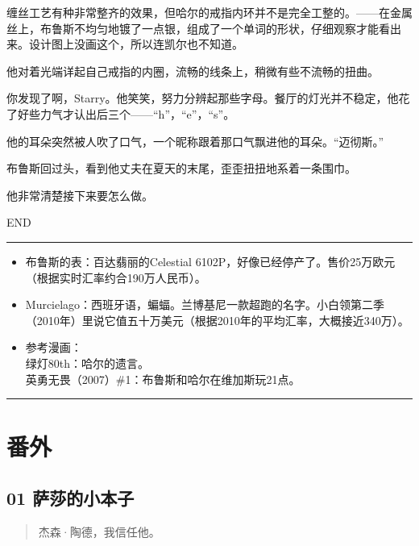 \documentclass[../main]{subfiles}
\begin{document}
缠丝工艺有种非常整齐的效果，但哈尔的戒指内环并不是完全工整的。——在金属丝上，布鲁斯不均匀地镀了一点银，组成了一个单词的形状，仔细观察才能看出来。设计图上没画这个，所以连凯尔也不知道。

他对着光端详起自己戒指的内圈，流畅的线条上，稍微有些不流畅的扭曲。

你发现了啊，Starry。他笑笑，努力分辨起那些字母。餐厅的灯光并不稳定，他花了好些力气才认出后三个——“h”，“e”，“s”。

他的耳朵突然被人吹了口气，一个昵称跟着那口气飘进他的耳朵。“迈彻斯。”

布鲁斯回过头，看到他丈夫在夏天的末尾，歪歪扭扭地系着一条围巾。

他非常清楚接下来要怎么做。

END

\begin{center}\rule{0.5\linewidth}{0.5pt}\end{center}

\begin{itemize}
    \item
          布鲁斯的表：百达翡丽的Celestial
          6102P，好像已经停产了。售价25万欧元（根据实时汇率约合190万人民币）。
    \item
          Murcielago：西班牙语，蝙蝠。兰博基尼一款超跑的名字。小白领第二季（2010年）里说它值五十万美元（根据2010年的平均汇率，大概接近340万）。
    \item
          参考漫画：\\
          绿灯80th：哈尔的遗言。\\
          英勇无畏（2007）\#1：布鲁斯和哈尔在维加斯玩21点。
\end{itemize}

\begin{center}\rule{0.5\linewidth}{0.5pt}\end{center}

\hypertarget{ux756aux5916}{%
    \section{番外}\label{ux756aux5916}}

\hypertarget{01-ux8428ux838eux7684ux5c0fux672cux5b50}{%
    \subsection{01
        萨莎的小本子}\label{01-ux8428ux838eux7684ux5c0fux672cux5b50}}

\begin{quote}
    杰森·陶德，我信任他。
\end{quote}
\end{document}
